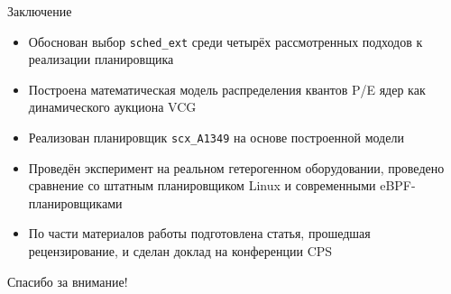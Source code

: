 \documentclass[aspectratio=169,11pt]{beamer}
\begin{document}
\begin{frame}{Заключение}
        \footnotesize
        \begin{itemize}\setlength{\itemsep}{0.4em}
                \item Обоснован выбор \texttt{sched\_ext} среди
                        четырёх рассмотренных подходов к реализации
                        планировщика
                \item Построена математическая модель распределения
                        квантов P/E ядер как динамического
                        аукциона VCG
                \item Реализован планировщик \texttt{scx\_A1349}
                        на основе построенной модели
                \item Проведён эксперимент на реальном
                        гетерогенном оборудовании, проведено
                        сравнение со штатным планировщиком Linux
                        и современными eBPF-планировщиками
                \item По части материалов работы подготовлена
                        статья, прошедшая рецензирование,
                        и сделан доклад на конференции CPS
        \end{itemize}
\end{frame}


{
        \begin{frame}
                \vspace*{\fill}
                \begin{center}
                        {\LARGE Спасибо за внимание!}
                \end{center}
                \vspace*{\fill}
        \end{frame}
}


\appendix
\end{document}
